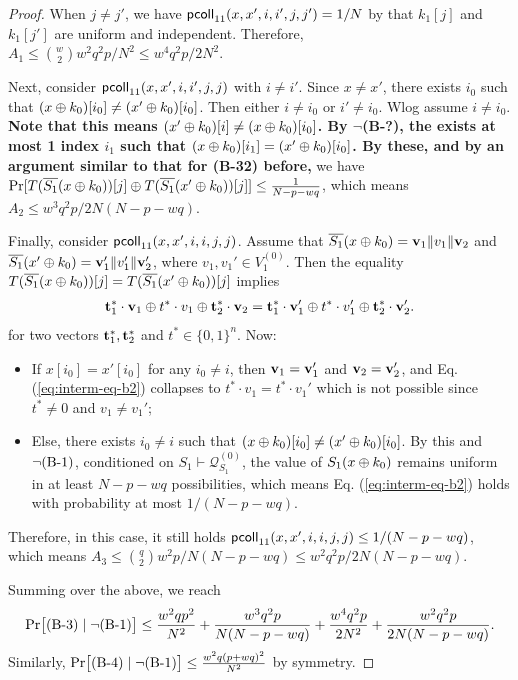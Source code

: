 \begin{proof}
When $j\neq j'$, we have $\mathsf{pcoll}_{11}(x,x',i,i',j,j')=1/N$ by that $k_1[j]$ and $k_1[j']$ are uniform and independent. Therefore, $A_1\leq{w\choose2}w^2q^2p/N^2\leq w^4q^2p/2N^2$.


Next, consider $\mathsf{pcoll}_{11}(x,x',i,i',j,j)$ with $i\neq i'$. Since $x\neq x'$, there exists $i_0$ such that $(x\oplus k_0)[i_0]\neq(x'\oplus k_0)[i_0]$. Then either $i\neq i_0$ or $i'\neq i_0$. Wlog assume $i\neq i_0$. \textbf{Note that this means $(x'\oplus k_0)[i]\neq(x\oplus k_0)[i_0]$. By $\neg$(B-?), the exists at most 1 index $i_1$ such that $(x\oplus k_0)[i_1]=(x'\oplus k_0)[i_0]$. By these, and by an argument similar to that for (B-32) before,} we have ${\Pr}[T(\overline{S_1}(x\oplus k_0))[j]\oplus T(\overline{S_1}(x'\oplus k_0))[j]]\leq\frac{1}{N-p-wq}$, which means $A_2\leq w^3q^2p/2N(N-p-wq)$.



Finally, consider $\mathsf{pcoll}_{11}(x,x',i,i,j,j)$. Assume that $\overline{S_1}(x\oplus k_0)=\mathbf{v}_1\|v_1\|\mathbf{v}_2$ and
$\overline{S_1}(x'\oplus k_0)=\mathbf{v}_1'\|v_1'\|\mathbf{v}_2'$, where $v_1,v_1'\in V_1^{(0)}$. Then the equality $T(\overline{S_1}(x\oplus k_0))[j]=T(\overline{S_1}(x'\oplus k_0))[j]$ implies
%
\begin{align}
\mathbf{t}_1^*\cdot\mathbf{v}_1\oplus t^*\cdot v_1\oplus\mathbf{t}_2^*\cdot\mathbf{v}_2=\mathbf{t}_1^*\cdot\mathbf{v}_1'\oplus t^*\cdot v_1'\oplus\mathbf{t}_2^*\cdot\mathbf{v}_2'.
\label{eq:interm-eq-b2}
\end{align}
%
%
for two vectors $\mathbf{t}_1^*,\mathbf{t}_2^*$ and $t^*\in\{0,1\}^n$. Now:
\begin{itemize}
	\item If $x[i_0]=x'[i_0]$ for any $i_0\neq i$, then $\mathbf{v}_1=\mathbf{v}_1'$ and $\mathbf{v}_2=\mathbf{v}_2'$, and Eq. (\ref{eq:interm-eq-b2}) collapses to $t^*\cdot v_1=t^*\cdot v_1'$ which is not possible since $t^*\neq 0$ and $v_1\neq v_1'$;
	\item Else, there exists $i_0\neq i$ such that $(x\oplus k_0)[i_0]\neq(x'\oplus k_0)[i_0]$. By this and $\neg\text{(B-1)}$, conditioned on $S_1\vdash\mathcal{Q}_{S_{1}}^{(0)}$, the value of $S_1(x\oplus k_0)$ remains uniform in at least $N-p-wq$ possibilities, which means Eq. (\ref{eq:interm-eq-b2}) holds with probability at most $1/(N-p-wq)$.
\end{itemize}
Therefore, in this case, it still holds $\mathsf{pcoll}_{11}(x,x',i,i,j,j)\leq1/(N-p-wq)$, which means $A_3\leq{q\choose2}w^2p/N(N-p-wq)\leq w^2q^2p/2N(N-p-wq)$.


Summing over the above, we reach
%
$${\Pr}\big[\text{(B-3)}\mid\neg\text{(B-1)}\big]\leq\frac{w^2qp^2}{N^2}
+
\frac{w^3q^2p}{N(N-p-wq)}
+
\frac{w^4q^2p}{2N^2}
+
\frac{w^2q^2p}{2N(N-p-wq)}.$$
%
Similarly, ${\Pr}\big[\text{(B-4)}\mid\neg\text{(B-1)}\big] \leq \frac{w^{2} q \left(p+w q\right)^{2}}{N^{2}}$ by symmetry.





\end{proof}
